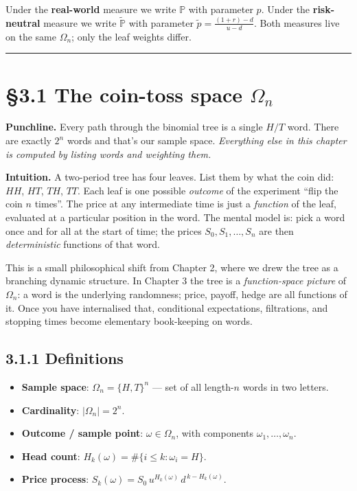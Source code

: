\documentclass[
  10pt,
  twoside]{book}
\providecommand{\tightlist}{%
  \setlength{\itemsep}{0pt}\setlength{\parskip}{0pt}}
\begin{document}
Under the \textbf{real-world} measure we write \(\mathbb P\) with
parameter \(p\). Under the \textbf{risk-neutral} measure we write
\(\tilde{\mathbb P}\) with parameter
\(\tilde p = \frac{(1+r) - d}{u - d}\). Both measures live on the same
\(\Omega_n\); only the leaf weights differ.

\begin{center}\rule{0.5\linewidth}{0.5pt}\end{center}

\section{\texorpdfstring{§3.1 The coin-toss space
\(\Omega_n\)}{§3.1 The coin-toss space \textbackslash Omega\_n}}\label{the-coin-toss-space-omega_n}

\textbf{Punchline.} Every path through the binomial tree is a single
\(H/T\) word. There are exactly \(2^n\) words and that's our sample
space. \emph{Everything else in this chapter is computed by listing
words and weighting them.}

\textbf{Intuition.} A two-period tree has four leaves. List them by what
the coin did: \(HH\), \(HT\), \(TH\), \(TT\). Each leaf is one possible
\emph{outcome} of the experiment ``flip the coin \(n\) times''. The
price at any intermediate time is just a \emph{function} of the leaf,
evaluated at a particular position in the word. The mental model is:
pick a word once and for all at the start of time; the prices
\(S_0, S_1, \ldots, S_n\) are then \emph{deterministic} functions of
that word.

This is a small philosophical shift from Chapter 2, where we drew the
tree as a branching dynamic structure. In Chapter 3 the tree is a
\emph{function-space picture} of \(\Omega_n\): a word is the underlying
randomness; price, payoff, hedge are all functions of it. Once you have
internalised that, conditional expectations, filtrations, and stopping
times become elementary book-keeping on words.

\subsection{3.1.1 Definitions}\label{definitions-6}

\begin{itemize}
\tightlist
\item
  \textbf{Sample space}: \(\Omega_n = \{H,T\}^n\) --- set of all
  length-\(n\) words in two letters.
\item
  \textbf{Cardinality}: \(|\Omega_n| = 2^n\).
\item
  \textbf{Outcome / sample point}: \(\omega \in \Omega_n\), with
  components \(\omega_1, \ldots, \omega_n\).
\item
  \textbf{Head count}: \(H_k(\omega) = \#\{i \le k : \omega_i = H\}\).
\item
  \textbf{Price process}:
  \(S_k(\omega) = S_0\, u^{H_k(\omega)}\, d^{\,k-H_k(\omega)}\).
\end{itemize}
\end{document}
